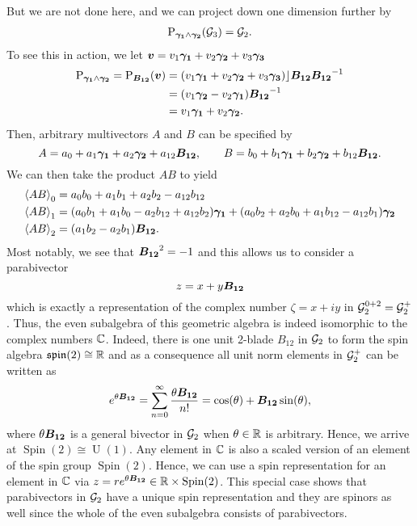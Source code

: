 But we are not done here, and we can project down one dimension further by
\begin{align*}
    \projection_{\blade{\gamma_1} \wedge \blade{\gamma_2}} (\G_3) = \G_2.
\end{align*}
To see this in action, we let $\blade{v}=v_1 \blade{\gamma_1} + v_2 \blade{\gamma_2} + v_3 \blade{\gamma_3}$
\begin{subequations}
\begin{align}
    \projection_{\blade{\gamma_1} \wedge \blade{\gamma_2}} = \projection_{\blade{B_{12}}} (\blade{v}) &= (v_1 \blade{\gamma_1} + v_2 \blade{\gamma_2} + v_3 \blade{\gamma_3})\rfloor \blade{B_{12}}\blade{B_{12}}^{-1}\\
    &= (v_1 \blade{\gamma_2} - v_2 \blade{\gamma_1})\blade{B_{12}}^{-1} \\
    &= v_1 \blade{\gamma_1} + v_2 \blade{\gamma_2}.
\end{align}
\end{subequations}
Then, arbitrary multivectors $A$ and $B$ can be specified by
\[
A = a_0 + a_1 \blade{\gamma_1} + a_2 \blade{\gamma_2} + a_{12} \blade{B_{12}}, \qquad B = b_0 +b_1 \blade{\gamma_1} + b_2 \blade{\gamma_2} + b_{12}\blade{B_{12}}.
\]
We can then take the product $AB$ to yield
\begin{subequations}
\begin{align}
\proj{0}{AB} &= a_0b_0 + a_1 b_1 + a_2 b_2 - a_{12}b_{12}\\
\proj{1}{AB} &= (a_0 b_1 + a_1 b_0 - a_2 b_{12} + a_{12} b_2) \blade{\gamma_1} + (a_0 b_2 + a_2 b_0 + a_1b_{12} - a_{12} b_1) \blade{\gamma_2}\\
\proj{2}{AB} &= (a_1b_2 - a_2 b_1)\blade{B_{12}}.
\end{align}
\end{subequations}
Most notably, we see that $\blade{B_{12}}^2=-1$ and this allows us to consider a parabivector
\begin{equation}
z = x + y \blade{B_{12}}
\end{equation}
which is exactly a representation of the complex number $\zeta = x+ iy$ in $\G_2^{0+2}=\G_2^+$.  Thus, the even subalgebra of this geometric algebra is indeed isomorphic to the complex numbers $\C$. Indeed, there is one unit 2-blade $B_{12}$ in $\G_2$ to form the spin algebra $\mathfrak{spin}(2) \cong \R$ and as a consequence all unit norm elements in $\G_2^+$ can be written as
\begin{equation}
   e^{\theta \blade{B_{12}}} = \sum_{n=0}^\infty \frac{\theta \blade{B_{12}}}{n!} = \cos(\theta)+\blade{B_{12}}\sin(\theta),
\end{equation}
where $\theta \blade{B_{12}}$ is a general bivector in $\G_2$ when $\theta \in \R$ is arbitrary. Hence, we arrive at $\operatorname{Spin}(2)\cong \operatorname{U}(1)$. Any element in $\C$ is also a scaled version of an element of the spin group $\operatorname{Spin}(2)$. Hence, we can use a spin representation for an element in $\C$ via $z=re^{\theta \blade{B_{12}}} \in \R\times \operatorname{Spin}(2)$.  This special case shows that parabivectors in $\G_2$ have a unique spin representation and they are spinors as well since the whole of the even subalgebra consists of parabivectors.

